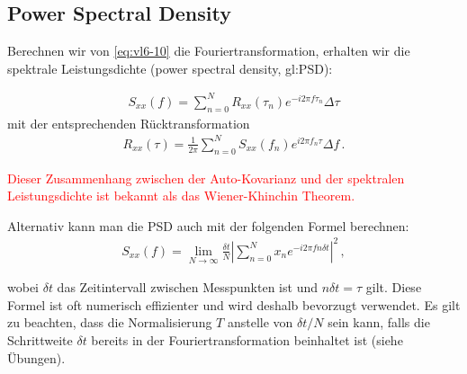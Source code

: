 \subsection{Power Spectral Density}
\label{subsec:vl7-2}

Berechnen wir von \cref{eq:vl6-10} die Fouriertransformation, erhalten wir die spektrale Leistungsdichte (power spectral density, \gls{gl:PSD}):

\begin{align}
S_{xx} (f) = \sum_{n=0}^{N} R_{xx} (\tau_n) e^{-i 2 \pi f \tau_n}\Delta \tau
\label{eq:vl7-1}
\end{align}
mit der entsprechenden Rücktransformation
\begin{align}
R_{xx} (\tau) = \frac{1}{2 \pi} \sum_{n=0}^{N} S_{xx} (f_n) e^{i 2 \pi f_n \tau}\Delta f\,.
\label{eq:vl7-2}
\end{align}

\begin{center}
\textcolor{red}{
Dieser Zusammenhang zwischen der Auto-Kovarianz und der spektralen Leistungsdichte ist bekannt als das Wiener-Khinchin Theorem.}
\end{center}

Alternativ kann man die PSD auch mit der folgenden Formel berechnen:
\begin{align}
S_{xx} (f) = \lim_{N \rightarrow \infty} \frac{ \delta t }{ N } \left| \sum_{n=0}^{N} x_n e^{-i 2 \pi f n \delta t} \right|^2 \,,
\label{eq:vl7-3}
\end{align}

wobei $\delta t$ das Zeitintervall zwischen Messpunkten ist und $n \delta t = \tau$ gilt. Diese Formel ist oft numerisch effizienter und wird deshalb bevorzugt verwendet. Es gilt zu beachten, dass die Normalisierung $T$ anstelle von $\delta t/N$ sein kann, falls die Schrittweite $\delta t$ bereits in der Fouriertransformation beinhaltet ist (siehe Übungen).




